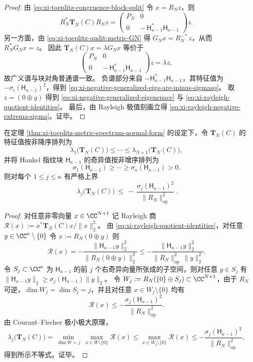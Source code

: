 \begin{proof}
由 \eqref{eq:xi-toeplitz-congruence-block-split} 令 \(x=R_N z\)，则
\[
R_N^{\ast}\mathbf{T}_N(C)R_N z
=
\begin{pmatrix}
P_N & 0\\
0 & -\,\mathsf H_{\kappa-1}^{\ast}\mathsf H_{\kappa-1}
\end{pmatrix}z.
\]
另一方面，由 \eqref{eq:xi-toeplitz-audit-metric-GN} 得
\(
G_N x=R_N^{-*}z
\)，从而
\(
R_N^{\ast}G_N x=z
\)。
因此 \(\mathbf{T}_N(C)x=\lambda G_N x\) 等价于
\[
\begin{pmatrix}
P_N & 0\\
0 & -\,\mathsf H_{\kappa-1}^{\ast}\mathsf H_{\kappa-1}
\end{pmatrix}z
=\lambda z,
\]
故广义谱与块对角普通谱一致。
负谱部分来自 \(-\mathsf H_{\kappa-1}^{\ast}\mathsf H_{\kappa-1}\)，其特征值为 \(-\sigma_i(\mathsf H_{\kappa-1})^2\)，得到 \eqref{eq:xi-negative-generalized-eigs-are-minus-sigmasq}。
取 \(z=(0\oplus y)\) 得到 \eqref{eq:xi-negative-generalized-eigenspace} 与 \eqref{eq:xi-rayleigh-quotient-identities}。
最后，由 Rayleigh 极值刻画立得 \eqref{eq:xi-rayleigh-negative-extrema-sigma}。证毕。
\end{proof}

\begin{theorem}\label{thm:xi-toeplitz-negative-spectrum-upperbound-by-hankel-singular}
在定理 \ref{thm:xi-toeplitz-metric-spectrum-normal-form} 的设定下，令 \(\mathbf{T}_N(C)\) 的特征值按非降序排列为
\[
\lambda_1\!\bigl(\mathbf{T}_N(C)\bigr)\le \cdots \le \lambda_{N+1}\!\bigl(\mathbf{T}_N(C)\bigr),
\]
并将 Hankel 指纹块 \(\mathsf H_{\kappa-1}\) 的奇异值按非增序排列为
\[
\sigma_1(\mathsf H_{\kappa-1})\ge \cdots \ge \sigma_\kappa(\mathsf H_{\kappa-1})>0.
\]
则对每个 \(1\le j\le \kappa\) 有严格上界
\[
\boxed{\;
\lambda_j\!\bigl(\mathbf{T}_N(C)\bigr)\ \le\ -\,\frac{\sigma_j(\mathsf H_{\kappa-1})^2}{\|R_N\|_{\mathrm{op}}^{2}}\; }.
\]
\end{theorem}
\begin{proof}
对任意非零向量 \(x\in\CC^{N+1}\) 记 Rayleigh 商
\(
\mathcal R(x):=x^{\ast}\mathbf{T}_N(C)x/\|x\|_2^2
\)。
由 \eqref{eq:xi-rayleigh-quotient-identities}，对任意 \(y\in\CC^{\kappa}\setminus\{0\}\) 令 \(x:=R_N(0\oplus y)\) 则
\[
\mathcal R(x)
=-\frac{\|\mathsf H_{\kappa-1}y\|_2^2}{\|R_N(0\oplus y)\|_2^2}
\le -\frac{\|\mathsf H_{\kappa-1}y\|_2^2}{\|R_N\|_{\mathrm{op}}^{2}\,\|y\|_2^2}.
\]
令 \(S_j\subset\CC^\kappa\) 为 \(\mathsf H_{\kappa-1}\) 的前 \(j\) 个右奇异向量所张成的子空间，则对任意 \(y\in S_j\) 有
\(
\|\mathsf H_{\kappa-1}y\|_2\ge \sigma_j(\mathsf H_{\kappa-1})\|y\|_2
\)。
令 \(W_j:=R_N(\{0\}\oplus S_j)\subset\CC^{N+1}\)，由于 \(R_N\) 可逆，\(\dim W_j=\dim S_j=j\)，并且对任意 \(x\in W_j\setminus\{0\}\) 均有
\[
\mathcal R(x)\le -\frac{\sigma_j(\mathsf H_{\kappa-1})^2}{\|R_N\|_{\mathrm{op}}^{2}}.
\]
由 Courant--Fischer 极小极大原理，
\[
\lambda_j\!\bigl(\mathbf{T}_N(C)\bigr)
=\min_{\dim W=j}\ \max_{x\in W\setminus\{0\}}\mathcal R(x)
\le \max_{x\in W_j\setminus\{0\}}\mathcal R(x)
\le -\frac{\sigma_j(\mathsf H_{\kappa-1})^2}{\|R_N\|_{\mathrm{op}}^{2}},
\]
得到所示不等式。证毕。
\end{proof}

